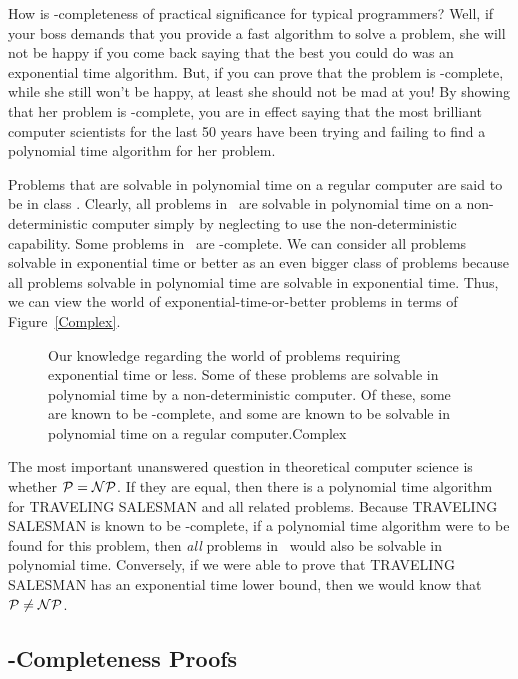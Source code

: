 How is \NP-completeness of practical significance for typical
programmers?
Well, if your boss demands that you provide a fast algorithm to solve
a problem, she will not be happy if you come back saying that the
best you could do was an exponential time algorithm.
But, if you can prove that the problem is \NP-complete, while she
still won't be happy, at least she should not be mad at you!
By showing that her problem is \NP-complete, you are in effect saying
that the most brilliant computer scientists for the last 50 years
have been trying and failing to find a polynomial time algorithm for
her problem.

Problems that are solvable in polynomial time on a regular computer
are said to be in class \Poly.
Clearly, all problems in \Poly\ are solvable in polynomial time on a
non-deterministic computer simply by neglecting to use the
non-deterministic capability.
Some problems in \NP\ are \NP-complete.
We can consider all problems solvable in exponential time or better as
an even bigger class of problems because all problems solvable in
polynomial time are solvable in exponential time.
Thus, we can view the world of exponential-time-or-better problems in
terms of Figure~\ref{Complex}.

\begin{figure}
\vspace{-\medskipamount}
{Our knowledge regarding the world of problems requiring exponential
time or less.
Some of these problems are solvable in polynomial time by a
non-deterministic computer.
Of these, some are known to be \NP-complete, and some are known to be
solvable in polynomial time on a regular computer.}{Complex}
\bigskip\medskip
\end{figure}

The most important unanswered question in theoretical computer
science is whether \(\mbox{${\cal P}$} = \mbox{${\cal NP}$}\).
If they are equal, then there is a polynomial time
algorithm for TRAVELING SALESMAN and all related problems.
Because TRAVELING SALESMAN is known to be \NP-complete, if a
polynomial time algorithm were to be found for this problem, then
\emph{all} problems in \NP\ would also be solvable in polynomial
time.
Conversely, if we were able to prove that TRAVELING SALESMAN has an
exponential time lower bound, then we would know that
\(\mbox{${\cal P}$} \neq \mbox{${\cal NP}$}\).

\subsection{\NP-Completeness Proofs}


